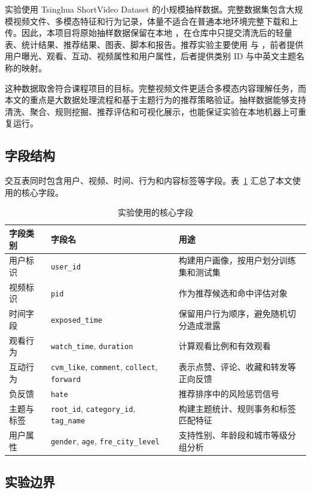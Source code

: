 \documentclass[UTF8,a4paper,12pt,fontset=none]{ctexart}
\begin{document}
实验使用 Tsinghua ShortVideo Dataset 的小规模抽样数据。完整数据集包含大规模视频文件、多模态特征和行为记录，体量不适合在普通本地环境完整下载和上传。因此，本项目将原始抽样数据保留在本地 ，在仓库中只提交清洗后的轻量表、统计结果、推荐结果、图表、脚本和报告。推荐实验主要使用  与 ，前者提供用户曝光、观看、互动、视频属性和用户属性，后者提供类别 ID 与中英文主题名称的映射。

这种数据取舍符合课程项目的目标。完整视频文件更适合多模态内容理解任务，而本文的重点是大数据处理流程和基于主题行为的推荐策略验证。抽样数据能够支持清洗、聚合、规则挖掘、推荐评估和可视化展示，也能保证实验在本地机器上可重复运行。

\subsection{字段结构}

交互表同时包含用户、视频、时间、行为和内容标签等字段。表~\ref{tab:fields} 汇总了本文使用的核心字段。

\begin{table}[H]
\centering
\caption{实验使用的核心字段}
\label{tab:fields}
\begin{tabular}{p{2.5cm}p{3.8cm}p{7.6cm}}
\toprule
字段类别 & 字段名 & 用途 \\
\midrule
用户标识 & \texttt{user\_id} & 构建用户画像，按用户划分训练集和测试集 \\
视频标识 & \texttt{pid} & 作为推荐候选和命中评估对象 \\
时间字段 & \texttt{exposed\_time} & 保留用户行为顺序，避免随机切分造成泄露 \\
观看行为 & \texttt{watch\_time}, \texttt{duration} & 计算观看比例和有效观看 \\
互动行为 & \texttt{cvm\_like}, \texttt{comment}, \texttt{collect}, \texttt{forward} & 表示点赞、评论、收藏和转发等正向反馈 \\
负反馈 & \texttt{hate} & 推荐排序中的风险惩罚信号 \\
主题与标签 & \texttt{root\_id}, \texttt{category\_id}, \texttt{tag\_name} & 构建主题统计、规则事务和标签匹配特征 \\
用户属性 & \texttt{gender}, \texttt{age}, \texttt{fre\_city\_level} & 支持性别、年龄段和城市等级分组分析 \\
\bottomrule
\end{tabular}
\end{table}

\subsection{实验边界}
\end{document}
